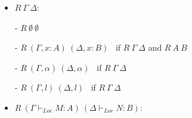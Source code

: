 \documentclass[a4paper]{article}
\theoremstyle{plain}
\theoremstyle{definition}
\newcommand{\typing}[4]{#1\vdash_{#2} #3 : #4}
\newcommand{\Loc}{Loc}
\newcommand{\logicalRelText}{R}
\newcommand{\logicalRel}[2]{\logicalRelText \ #1 \ #2}
\newcommand{\logicalRelJudg}[2]{\logicalRelText \ (#1) \ (#2)}
\begin{document}
\begin{itemize}
\item $\logicalRel{\Gamma}{\Delta}$:
\end{itemize}

\begin{itemize}
\item[-] $\logicalRel{\emptyset}{\emptyset}$

\item[-] 
$\logicalRel{(\Gamma,x:A)}{(\Delta,x:B)}$ \
if
$\logicalRel{\Gamma}{\Delta}$ and $\logicalRel{A}{B}$

\item[-] 
$\logicalRel{(\Gamma,\alpha)}{(\Delta,\alpha)}$ \ 
if
$\logicalRel{\Gamma}{\Delta}$

\item[-] 
$\logicalRel{(\Gamma,l)}{(\Delta,l)}$ \ 
if
$\logicalRel{\Gamma}{\Delta}$
\end{itemize}

\begin{itemize}
\item
$\logicalRelJudg
 {\typing{\Gamma}{\Loc}{M}{A}}
 {\typing{\Delta}{\Loc}{N}{B}}$:
\end{itemize}
\end{document}
